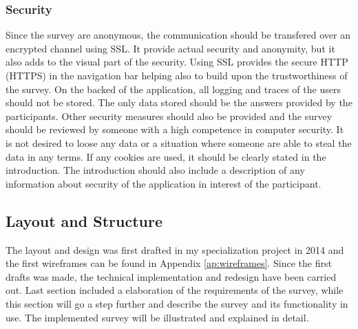     \subsubsection*{Security}
      Since the survey are anonymous, the communication should be transfered over an encrypted channel using SSL. It provide actual security and anonymity, but it also adds to the visual part of the security. Using SSL provides the secure HTTP (HTTPS) in the navigation bar helping also to build upon the trustworthiness of the survey.
      On the backed of the application, all logging and traces of the users should not be stored. The only data stored should be the answers provided by the participants. 
      Other security measures should also be provided and the survey should be reviewed by someone with a high competence in computer security. It is not desired to loose any data or a situation where someone are able to steal the data in any terms.
      If any cookies are used, it should be clearly stated in the introduction. The introduction should also include a description of any information about security of the application in interest of the participant.

	\subsection{Layout and Structure}

    The layout and design was first drafted in my specialization project in 2014 and the first wireframes can be found in Appendix \ref{ap:wireframes}. Since the first drafts was made, the technical implementation and redesign have been carried out. Last section included a elaboration of the requirements of the survey, while this section will go a step further and describe the survey and its functionality in use. The implemented survey will be illustrated and explained in detail. 

